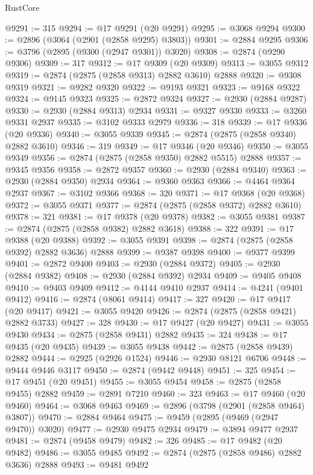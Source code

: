 \begin{lexlean}{RustCore}
\begin{coremodule}
@9291 := 315
@9294 := @17 @9291 (@20 @9291)
@9295 := @3068 @9294
@9300 := @2896 (@3064 (@2901 (@2858 @9295) @3803))
@9301 := @2884 @9295
@9306 := @3796 (@2895 (@9300 (@2947 @9301)) @3020)
@9308 := @2874 (@9290 @9306)
@9309 := 317
@9312 := @17 @9309 (@20 @9309)
@9313 := @3055 @9312
@9319 := @2874 (@2875 (@2858 @9313) @2882 @3610) @2888
@9320 := @9308 @9319
@9321 := @9282 @9320
@9322 := @9193 @9321
@9323 := @9168 @9322
@9324 := @9145 @9323
@9325 := @2872 @9324
@9327 := @2930 (@2884 @9287)
@9330 := @2930 (@2884 @9313) @2934
@9331 := @9327 @9330
@9333 := @3260 @9331 @2937
@9335 := @3102 @9333 @2979
@9336 := 318
@9339 := @17 @9336 (@20 @9336)
@9340 := @3055 @9339
@9345 := @2874 (@2875 (@2858 @9340) @2882 @3610)
@9346 := 319
@9349 := @17 @9346 (@20 @9346)
@9350 := @3055 @9349
@9356 := @2874 (@2875 (@2858 @9350) @2882 @5515) @2888
@9357 := @9345 @9356
@9358 := @2872 @9357
@9360 := @2930 (@2884 @9340)
@9363 := @2930 (@2884 @9350) @2934
@9364 := @9360 @9363
@9366 := @4464 @9364 @2937
@9367 := @3102 @9366
@9368 := 320
@9371 := @17 @9368 (@20 @9368)
@9372 := @3055 @9371
@9377 := @2874 (@2875 (@2858 @9372) @2882 @3610)
@9378 := 321
@9381 := @17 @9378 (@20 @9378)
@9382 := @3055 @9381
@9387 := @2874 (@2875 (@2858 @9382) @2882 @3618)
@9388 := 322
@9391 := @17 @9388 (@20 @9388)
@9392 := @3055 @9391
@9398 := @2874 (@2875 (@2858 @9392) @2882 @3636) @2888
@9399 := @9387 @9398
@9400 := @9377 @9399
@9401 := @2872 @9400
@9403 := @2930 (@2884 @9372)
@9405 := @2930 (@2884 @9382)
@9408 := @2930 (@2884 @9392) @2934
@9409 := @9405 @9408
@9410 := @9403 @9409
@9412 := @4144 @9410 @2937
@9414 := @4241 (@9401 @9412)
@9416 := @2874 (@8061 @9414)
@9417 := 327
@9420 := @17 @9417 (@20 @9417)
@9421 := @3055 @9420
@9426 := @2874 (@2875 (@2858 @9421) @2882 @3733)
@9427 := 328
@9430 := @17 @9427 (@20 @9427)
@9431 := @3055 @9430
@9434 := @2875 (@2858 @9431) @2882
@9435 := 324
@9438 := @17 @9435 (@20 @9435)
@9439 := @3055 @9438
@9442 := @2875 (@2858 @9439) @2882
@9444 := @2925 (@2926 @1524)
@9446 := @2930 @8121 @6706
@9448 := @9444 @9446 @3117
@9450 := @2874 (@9442 @9448)
@9451 := 325
@9454 := @17 @9451 (@20 @9451)
@9455 := @3055 @9454
@9458 := @2875 (@2858 @9455) @2882
@9459 := @2891 @7210
@9460 := 323
@9463 := @17 @9460 (@20 @9460)
@9464 := @3068 @9463
@9469 := @2896 (@3798 (@2901 (@2858 @9464) @3807))
@9470 := @2884 @9464
@9475 := @9459 (@2895 (@9469 (@2947 @9470)) @3020)
@9477 := @2930 @9475 @2934
@9479 := @3894 @9477 @2937
@9481 := @2874 (@9458 @9479)
@9482 := 326
@9485 := @17 @9482 (@20 @9482)
@9486 := @3055 @9485
@9492 := @2874 (@2875 (@2858 @9486) @2882 @3636) @2888
@9493 := @9481 @9492

\end{coremodule}
\end{lexlean}
